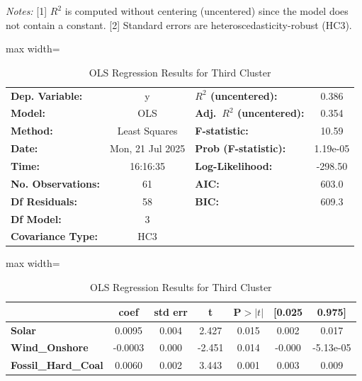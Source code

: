 \documentclass{article}
\begin{document}
\begin{table}[t]
\footnotesize
\medskip

\emph{Notes:} [1] $R^2$ is computed without centering (uncentered) since the model does not contain a constant. [2] Standard errors are heteroscedasticity-robust (HC3).
\end{table}


\begin{table}[t]
\centering
\caption{OLS Regression Results for Third Cluster}
\label{tab:ols_results_Third_cluster}
\setlength\tabcolsep{3.5pt}
\renewcommand{\arraystretch}{1.15}
\small

\begin{adjustbox}{max width=\textwidth}
\begin{tabular}{lclc}
\toprule
\textbf{Dep. Variable:}    & y   & \textbf{$R^2$ (uncentered):}        & 0.386 \\
\textbf{Model:}            & OLS & \textbf{Adj.\ $R^2$ (uncentered):}  & 0.354 \\
\textbf{Method:}           & Least Squares & \textbf{F-statistic:}      & 10.59 \\
\textbf{Date:}             & Mon, 21 Jul 2025 & \textbf{Prob (F-statistic):} & 1.19e-05 \\
\textbf{Time:}             & 16:16:35 & \textbf{Log-Likelihood:}    & -298.50 \\
\textbf{No. Observations:} & 61  & \textbf{AIC:}                 & 603.0 \\
\textbf{Df Residuals:}     & 58  & \textbf{BIC:}                 & 609.3 \\
\textbf{Df Model:}         & 3   &                                &       \\
\textbf{Covariance Type:}  & HC3 &                                &       \\
\bottomrule
\end{tabular}
\end{adjustbox}

\vspace{0.6em}

\begin{adjustbox}{max width=\textwidth}
\begin{tabular}{lcccccc}
 & \textbf{coef} & \textbf{std err} & \textbf{t} & \textbf{P$>|t|$} & \textbf{[0.025} & \textbf{0.975]} \\
\midrule
\textbf{Solar}         & 0.0095  & 0.004 &  2.427 & 0.015 & 0.002     & 0.017 \\
\textbf{Wind\_Onshore} & -0.0003 & 0.000 & -2.451 & 0.014 & -0.000    & -5.13e-05 \\
\textbf{Fossil\_Hard\_Coal} & 0.0060  & 0.002 &  3.443 & 0.001 & 0.003     & 0.009 \\
\bottomrule
\end{tabular}
\end{adjustbox}


\end{table}
\end{document}
